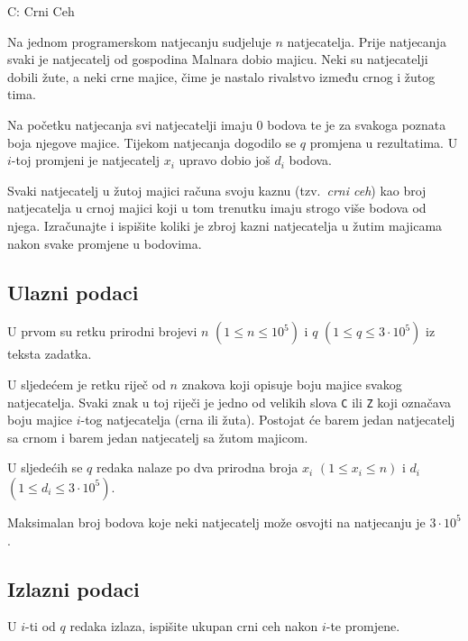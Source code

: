 \begin{statement}[
  timelimit=1 s,
  memorylimit=512 MiB,
]{C: Crni Ceh}

Na jednom programerskom natjecanju sudjeluje $n$ natjecatelja. Prije natjecanja
svaki je natjecatelj od gospodina Malnara dobio majicu. Neki su natjecatelji
dobili žute, a neki crne majice, čime je nastalo rivalstvo između crnog i žutog
tima.

Na početku natjecanja svi natjecatelji imaju $0$ bodova te je za svakoga poznata
boja njegove majice. Tijekom natjecanja dogodilo se $q$ promjena u rezultatima.
U $i$-toj promjeni je natjecatelj $x_i$ upravo dobio još $d_i$ bodova.

Svaki natjecatelj u žutoj majici računa svoju kaznu (tzv.\ \textit{crni ceh})
kao broj natjecatelja u crnoj majici koji u tom trenutku imaju strogo više
bodova od njega. Izračunajte i ispišite koliki je zbroj kazni natjecatelja u
žutim majicama nakon svake promjene u bodovima.

\subsection*{Ulazni podaci}
U prvom su retku prirodni brojevi $n$ $(1 \le n \le 10^5) $ i
$q$ $(1 \le q \le 3 \cdot 10^5)$ iz teksta zadatka.

U sljedećem je retku riječ od $n$ znakova koji opisuje boju majice svakog
natjecatelja. Svaki znak u toj riječi je jedno od velikih slova \texttt{C}
ili \texttt{Z} koji označava boju majice $i$-tog natjecatelja (crna ili žuta).
Postojat će barem jedan natjecatelj sa crnom i barem jedan natjecatelj sa žutom
majicom.

U sljedećih se $q$ redaka nalaze po dva prirodna broja $x_i$ $(1 \le x_i \le n)$ i
$d_i$ $(1 \le d_i \le 3 \cdot 10^5)$.

Maksimalan broj bodova koje neki natjecatelj može osvojti na natjecanju je
$3 \cdot 10^5$.

\subsection*{Izlazni podaci}
U $i$-ti od $q$ redaka izlaza, ispišite ukupan crni ceh nakon $i$-te promjene.


\end{statement}
